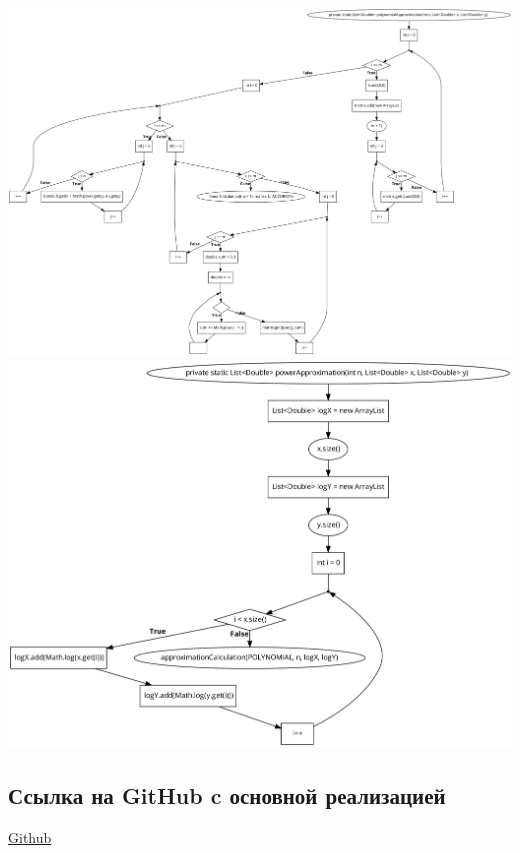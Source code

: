 \documentclass{article}
\begin{document}
             \\
             \includegraphics[scale=0.2]{polynom_approx.png}
             \\
             \includegraphics[scale=0.2]{power_approx.png}
             
      \subsection{Ссылка на GitHub c основной реализацией}
            \href{https://github.com/isofinly/compmath}{Github}
\end{document}
